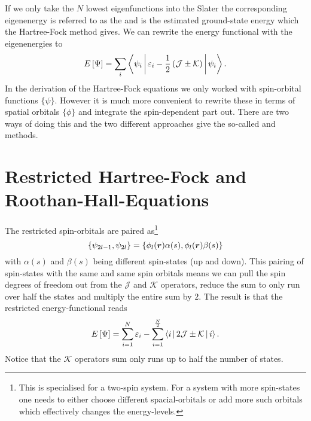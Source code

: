         If we only take the $N$ lowest eigenfunctions into the Slater the
        corresponding eigenenergy is referred to as the  and is the estimated ground-state energy which the Hartree-Fock
        method gives. We can rewrite the energy functional with the
        eigenenergies to
            \begin{equation}
                E\left[\Psi\right] = \sum_i\Braket{\psi_i | \varepsilon_i -
                \frac{1}{2}\left(\mathcal{J} \pm \mathcal{K}\right) | \psi_i}
                \label{eq:energyJKHF}.
            \end{equation}
        In the derivation of the Hartree-Fock equations we only worked with
        spin-orbital functions $\{\psi\}$. However it is much more convenient
        to rewrite these in terms of spatial orbitals $\{\phi\}$ and integrate
        the spin-dependent part out. There are two ways of doing this and the
        two different approaches give the so-called  and  methods.

    \section{Restricted Hartree-Fock and Roothan-Hall-Equations}
        The restricted spin-orbitals are paired as\footnote{This is specialised
        for a two-spin system. For a system with more spin-states one needs to
        either choose different spacial-orbitals or add more such orbitals
        which effectively changes the energy-levels.}
            \begin{equation}
                \{\psi_{2l-1}, \psi_{2l}\} =
                \{\phi_l(\boldsymbol{{r}})\alpha(s),\phi_l(\boldsymbol{{r}})\beta(s)\}
                \label{eq:spinpairingHF}
            \end{equation}
        with $\alpha(s)$ and $\beta(s)$ being different spin-states (up and
        down). This pairing of spin-states with the same and same
        spin orbitals means we can pull the spin degrees of freedom out from
        the $\mathcal{J}$ and $\mathcal{K}$ operators, reduce the sum to only
        run over half the states and multiply the entire sum by $2$. The result
        is that the restricted energy-functional reads
            \begin{equation}
                E\left[\Psi\right] = \sum\limits^N_{i=1}\varepsilon_i -
                \sum\limits^{\frac{N}{2}}_{i=1} \Braket{i | 2\mathcal{J}
                \pm \mathcal{K} | i}.
            \end{equation}
        Notice that the $\mathcal{K}$ operators sum only runs up to half the
        number of states.
        
